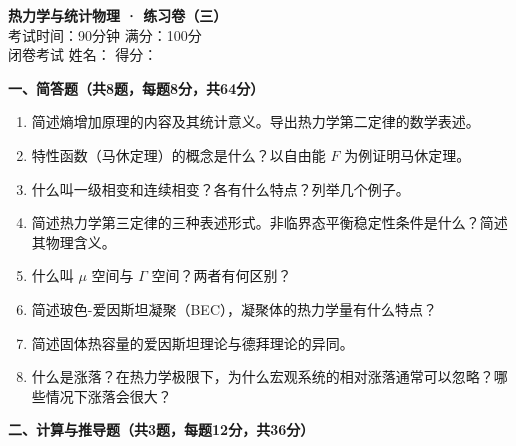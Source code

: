 \documentclass[12pt,a4paper,fontset=mac]{ctexart}
\newcommand{\đ}{\mathrm{đ}}
\newcommand{\shortanswer}{\vspace{5.5cm}}
\begin{document}
\newpage

\begin{center}
{\LARGE \textbf{热力学与统计物理 · 练习卷（三）}}\\[0.5em]
{\large 考试时间：90分钟 \quad 满分：100分}\\[0.3em]
{\normalsize 闭卷考试 \quad 姓名：\underline{\hspace{3cm}} \quad 得分：\underline{\hspace{2cm}}}
\end{center}

\vspace{0.5em}

\noindent\textbf{一、简答题（共8题，每题8分，共64分）}

\begin{enumerate}
\item 简述熵增加原理的内容及其统计意义。导出热力学第二定律的数学表述。
\shortanswer

\item 特性函数（马休定理）的概念是什么？以自由能 $F$ 为例证明马休定理。
\shortanswer

\item 什么叫一级相变和连续相变？各有什么特点？列举几个例子。
\shortanswer

\item 简述热力学第三定律的三种表述形式。非临界态平衡稳定性条件是什么？简述其物理含义。
\shortanswer

\item 什么叫 $\mu$ 空间与 $\Gamma$ 空间？两者有何区别？
\shortanswer

\item 简述玻色-爱因斯坦凝聚（BEC），凝聚体的热力学量有什么特点？
\shortanswer

\item 简述固体热容量的爱因斯坦理论与德拜理论的异同。
\shortanswer

\item 什么是涨落？在热力学极限下，为什么宏观系统的相对涨落通常可以忽略？哪些情况下涨落会很大？
\shortanswer

\end{enumerate}

\newpage

\noindent\textbf{二、计算与推导题（共3题，每题12分，共36分）}
\end{document}

